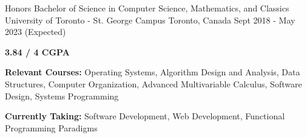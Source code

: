 

\begin{cventries}
  \cventry
  {Honors Bachelor of Science in Computer Science, Mathematics, and Classics} %
  {University of Toronto - St. George Campus} %
  {Toronto, Canada} %
  {Sept 2018 - May 2023 (Expected)} %
  {
    \begin{cvitems} %
      \item {\textbf{3.84 / 4 CGPA}}
      \item {\textbf{Relevant Courses:} Operating Systems, Algorithm Design and Analysis, Data Structures, Computer Organization, Advanced Multivariable Calculus, Software Design, Systems Programming}
      \item {\textbf{Currently Taking:} Software Development, Web Development, Functional Programming Paradigms}
    \end{cvitems}
  }

\end{cventries}
